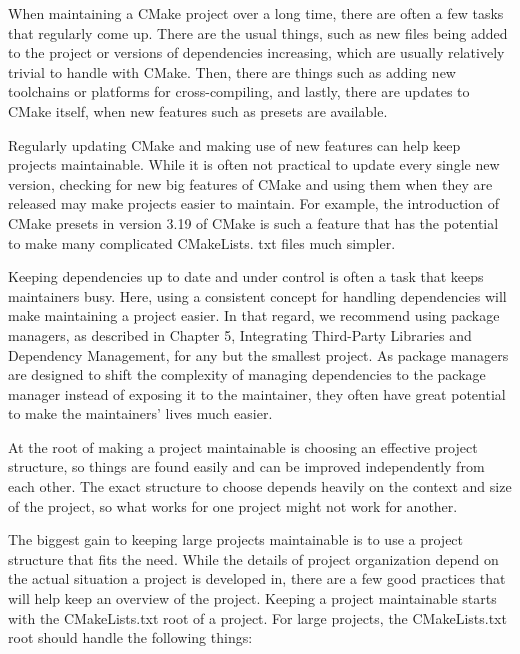 When maintaining a CMake project over a long time, there are often a few tasks that regularly come up. There are the usual things, such as new files being added to the project or versions of dependencies increasing, which are usually relatively trivial to handle with CMake. Then, there are things such as adding new toolchains or platforms for cross-compiling, and lastly, there are updates to CMake itself, when new features such as presets are available.

Regularly updating CMake and making use of new features can help keep projects maintainable. While it is often not practical to update every single new version, checking for new big features of CMake and using them when they are released may make projects easier to maintain. For example, the introduction of CMake presets in version 3.19 of CMake is such a feature that has the potential to make many complicated CMakeLists. txt files much simpler.

Keeping dependencies up to date and under control is often a task that keeps maintainers busy. Here, using a consistent concept for handling dependencies will make maintaining a project easier. In that regard, we recommend using package managers, as described in Chapter 5, Integrating Third-Party Libraries and Dependency Management, for any but the smallest project. As package managers are designed to shift the complexity of managing dependencies to the package manager instead of exposing it to the maintainer, they often have great potential to make the maintainers' lives much easier.

At the root of making a project maintainable is choosing an effective project structure, so things are found easily and can be improved independently from each other. The exact structure to choose depends heavily on the context and size of the project, so what works for one project might not work for another.

The biggest gain to keeping large projects maintainable is to use a project structure that fits the need. While the details of project organization depend on the actual situation a project is developed in, there are a few good practices that will help keep an overview of the project. Keeping a project maintainable starts with the CMakeLists.txt root of a project. For large projects, the CMakeLists.txt root should handle the following things:

